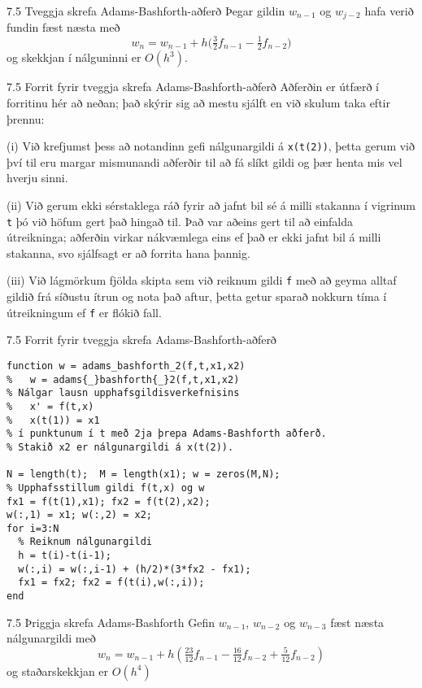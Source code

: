 \begin{frame}{7.5 Tveggja skrefa Adams-Bashforth-aðferð} 
Þegar gildin $w_{n-1}$
og $w_{j-2}$ hafa verið fundin fæst næsta með 
\begin{equation*}
  w_{n} = w_{n-1} + h\big(\tfrac 32 f_{n-1} - \tfrac 12 f_{n-2}\big)
\end{equation*}
og skekkjan í nálguninni er $O(h^3)$. 
\end{frame}


\begin{frame}{7.5 Forrit fyrir tveggja skrefa Adams-Bashforth-aðferð} 
Aðferðin er útfærð í forritinu hér að neðan; það skýrir sig að mestu
sjálft en við skulum taka eftir 
þrennu:  

\pause
\smallskip
(i) Við krefjumst þess að notandinn gefi nálgunargildi á
{\tt x(t(2))}, þetta gerum við því til eru margar mismunandi aðferðir
til að fá slíkt gildi og þær henta mis vel hverju sinni. 

\pause
\smallskip
(ii) Við gerum ekki sérstaklega ráð fyrir að jafnt bil sé á milli
stakanna í vigrinum {\tt t} þó við höfum gert það hingað til. Það var
aðeins gert til að einfalda útreikninga; aðferðin virkar nákvæmlega
eins ef það er ekki jafnt bil á milli stakanna, svo sjálfsagt er að
forrita hana þannig. 

\pause
\smallskip
(iii) Við lágmörkum fjölda skipta sem við reiknum gildi {\tt f} með að
geyma alltaf gildið frá síðustu ítrun og nota það aftur, þetta getur
sparað nokkurn tíma í útreikningum ef {\tt f} er flókið fall. 
\end{frame}


\begin{frame}[fragile]{7.5 Forrit fyrir tveggja skrefa Adams-Bashforth-aðferð} 
\begin{verbatim}
function w = adams_bashforth_2(f,t,x1,x2)
%   w = adams{_}bashforth{_}2(f,t,x1,x2)
% Nálgar lausn upphafsgildisverkefnisins
%   x' = f(t,x)
%   x(t(1)) = x1
% í punktunum í t með 2ja þrepa Adams-Bashforth aðferð.
% Stakið x2 er nálgunargildi á x(t(2)).

N = length(t);  M = length(x1); w = zeros(M,N);
% Upphafsstillum gildi f(t,x) og w
fx1 = f(t(1),x1); fx2 = f(t(2),x2);
w(:,1) = x1; w(:,2) = x2;
for i=3:N
  % Reiknum nálgunargildi
  h = t(i)-t(i-1);
  w(:,i) = w(:,i-1) + (h/2)*(3*fx2 - fx1);
  fx1 = fx2; fx2 = f(t(i),w(:,i));
end
\end{verbatim}
\end{frame}


\begin{frame}{7.5 Þriggja skrefa Adams-Bashforth} 
Gefin $w_{n-1}$, $w_{n-2}$ og $w_{n-3}$ fæst næsta nálgunargildi með
\begin{equation*}
  w_{n} = w_{n-1} + {h}(\tfrac{23}{12} f_{n-1} - \tfrac {16}{12}
  f_{n-2} + \tfrac 5{12} f_{n-2})
\end{equation*}
og staðarskekkjan er $O(h^4)$
\end{frame}


